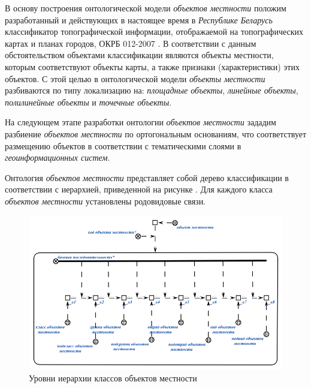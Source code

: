 В основу построения онтологической модели \textit{объектов местности} положим разработанный и действующих в настоящее время в \textit{Республике Беларусь} классификатор топографической  информации, отображаемой на топографических картах и планах городов, ОКРБ 012-2007 .
В соответствии с данным обстоятельством объектами классификации являются объекты местности, которым соответствуют объекты карты, а также признаки (характеристики) этих объектов.  
С этой целью в онтологической модели \textit{объекты местности} разбиваются по типу локализацию на: \textit{площадные объекты\scnsupergroupsign}, \textit{линейные объекты\scnsupergroupsign}, \textit{полилинейные объекты\scnsupergroupsign} и \textit{точечные объекты\scnsupergroupsign}.

На следующем этапе разработки онтологии \textit{объектов местности} зададим разбиение \textit{объектов местности} по ортогональным основаниям, что соответствует размещению объектов в соответствии с тематическими слоями в \textit{геоинформационных систем}.  

Онтология \textit{объектов местности} представляет собой дерево классификации в соответствии с иерархией, приведенной на рисунке . Для каждого класса \textit{объектов местности} установлены родовидовые связи. 

\begin{figure}[H]
\center
\includegraphics[scale=0.8]{author/part7/figures/geo_code.png}
\caption{Уровни иерархии классов объектов местности} 
\label{fig:pic1}
\end{figure}

